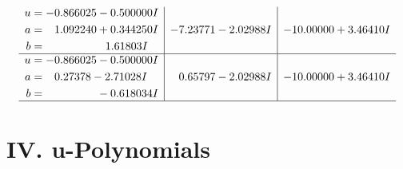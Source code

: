 \documentclass[1p]{elsarticle_modified}
\theoremstyle{definition}
\begin{document}
$$\begin{array}{c|c|c}
\begin{aligned}
u &= -0.866025 - 0.500000 I \\
a &= \phantom{-}1.092240 + 0.344250 I \\
b &= \phantom{-0.000000 -}1.61803 I\end{aligned}
 & -7.23771 - 2.02988 I & -10.00000 + 3.46410 I \\ \hline\begin{aligned}
u &= -0.866025 - 0.500000 I \\
a &= \phantom{-}0.27378 - 2.71028 I \\
b &= \phantom{-0.000000 } -0.618034 I\end{aligned}
 & \phantom{-}0.65797 - 2.02988 I & -10.00000 + 3.46410 I\\
 \hline 
 \end{array}$$\newpage
\newpage\renewcommand{\arraystretch}{1}
\centering \section*{ IV. u-Polynomials}
\end{document}
